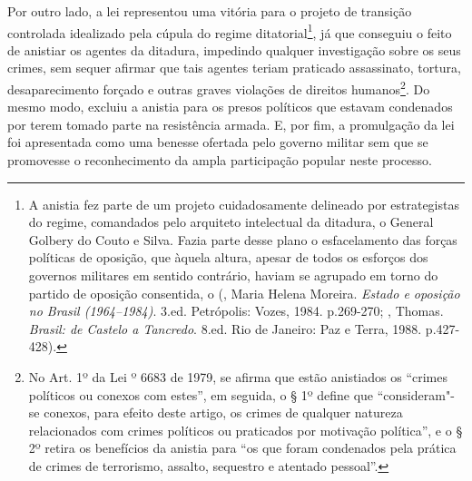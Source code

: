 Por outro lado, a lei representou uma vitória para o projeto de
transição controlada idealizado pela cúpula do regime
ditatorial\footnote{A anistia fez parte de um projeto cuidadosamente
  delineado por estrategistas do regime, comandados pelo arquiteto
  intelectual da ditadura, o General Golbery do Couto e Silva. Fazia
  parte desse plano o esfacelamento das forças políticas de oposição,
  que àquela altura, apesar de todos os esforços dos governos militares
  em sentido contrário, haviam se agrupado em torno do partido de
  oposição consentida, o  (, Maria Helena Moreira.
  \emph{Estado e oposição no Brasil (1964--1984)}. 3.ed. Petrópolis:
  Vozes, 1984. p.269-270; , Thomas. \emph{Brasil: de Castelo
  a Tancredo}. 8.ed. Rio de Janeiro: Paz e Terra, 1988. p.427-428).}, já
que conseguiu o feito de anistiar os agentes da ditadura, impedindo
qualquer investigação sobre os seus crimes, sem sequer afirmar que tais
agentes teriam praticado assassinato, tortura, desaparecimento forçado e
outras graves violações de direitos humanos\footnote{No Art. 1º da Lei
  º 6683 de 1979, se afirma que estão anistiados os ``crimes políticos
  ou conexos com estes'', em seguida, o § 1º define que ``consideram"-se
      conexos, para efeito deste artigo, os crimes de qualquer natureza
      relacionados com crimes políticos ou praticados por motivação
      política'', e o § 2º retira os benefícios da anistia para ``os que foram
              condenados pela prática de crimes de terrorismo, assalto, sequestro e
              atentado pessoal''.}. Do mesmo modo, excluiu a anistia para os presos
políticos que estavam condenados por terem tomado parte na resistência
armada. E, por fim, a promulgação da lei foi apresentada como uma
benesse ofertada pelo governo militar sem que se promovesse o
reconhecimento da ampla participação popular neste processo.

